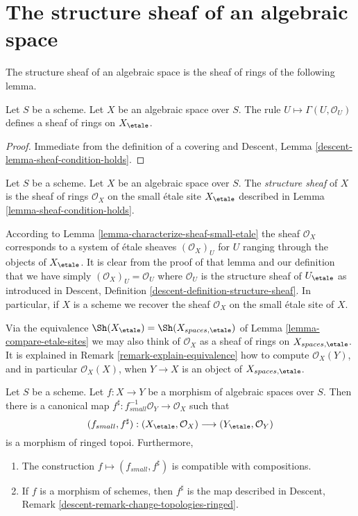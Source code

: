 \section{The structure sheaf of an algebraic space}
\label{section-structure-sheaf}

\noindent
The structure sheaf of an algebraic space is the sheaf of rings of the
following lemma.

\begin{lemma}
\label{lemma-sheaf-condition-holds}
Let $S$ be a scheme. Let $X$ be an algebraic space over $S$.
The rule $U \mapsto \Gamma(U, \mathcal{O}_U)$ defines
a sheaf of rings on $X_\etale$.
\end{lemma}

\begin{proof}
Immediate from the definition of a covering and
Descent, Lemma \ref{descent-lemma-sheaf-condition-holds}.
\end{proof}

\begin{definition}
\label{definition-structure-sheaf}
Let $S$ be a scheme.
Let $X$ be an algebraic space over $S$.
The {\it structure sheaf} of $X$
is the sheaf of rings $\mathcal{O}_X$
on the small \'etale site $X_\etale$ described in
Lemma \ref{lemma-sheaf-condition-holds}.
\end{definition}

\noindent
According to Lemma \ref{lemma-characterize-sheaf-small-etale} the sheaf
$\mathcal{O}_X$ corresponds to a system of \'etale sheaves $(\mathcal{O}_X)_U$
for $U$ ranging through the objects of $X_\etale$. It is clear from
the proof of that lemma and our definition that we have simply
$(\mathcal{O}_X)_U = \mathcal{O}_U$ where $\mathcal{O}_U$ is the structure
sheaf of $U_\etale$ as introduced in
Descent, Definition \ref{descent-definition-structure-sheaf}.
In particular, if $X$ is a scheme we recover the sheaf $\mathcal{O}_X$
on the small \'etale site of $X$.

\medskip\noindent
Via the equivalence
$\Sh(X_\etale) = \Sh(X_{spaces, \etale})$
of Lemma \ref{lemma-compare-etale-sites} we may also think of $\mathcal{O}_X$
as a sheaf of rings on $X_{spaces, \etale}$. It is explained in
Remark \ref{remark-explain-equivalence}
how to compute $\mathcal{O}_X(Y)$, and in particular $\mathcal{O}_X(X)$, when
$Y \to X$ is an object of $X_{spaces, \etale}$.

\begin{lemma}
\label{lemma-morphism-ringed-topoi}
Let $S$ be a scheme.
Let $f : X \to Y$ be a morphism of algebraic spaces over $S$.
Then there is a canonical map
$f^\sharp : f_{small}^{-1}\mathcal{O}_Y \to \mathcal{O}_X$ such that
$$
(f_{small}, f^\sharp) :
(X_\etale, \mathcal{O}_X)
\longrightarrow
(Y_\etale, \mathcal{O}_Y)
$$
is a morphism of ringed topoi. Furthermore,
\begin{enumerate}
\item The construction $f \mapsto (f_{small}, f^\sharp)$ is compatible with
compositions.
\item If $f$ is a morphism of schemes, then $f^\sharp$ is the map described in
Descent, Remark \ref{descent-remark-change-topologies-ringed}.
\end{enumerate}
\end{lemma}

